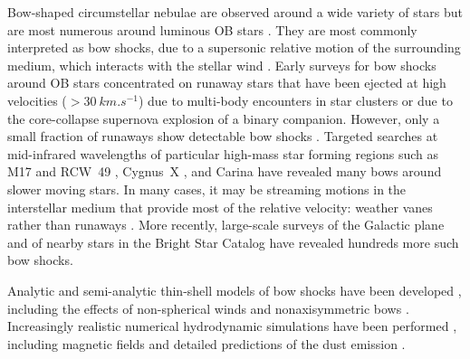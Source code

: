 \documentclass[useAMS, usenatbib, a4paper]{mnras}
\begin{document}
Bow-shaped circumstellar nebulae are observed around a wide variety of
stars \citep{Gull:1979a, Cox:2012a, Cordes:1993a} but are most
numerous around luminous OB stars \citep{Kobulnicky:2016a}.  They are
most commonly interpreted as bow shocks, due to a supersonic relative
motion of the surrounding medium, which interacts with the stellar
wind \citep{Wilkin:1996a}.  Early surveys for bow shocks around OB
stars \citep{van-Buren:1995a} concentrated on runaway stars
\citep{Blaauw:1961a, Hoogerwerf:2001a} that have been ejected at high
velocities (\(> \SI{30}{km.s^{-1}}\)) due to multi-body encounters in
star clusters or due to the core-collapse supernova explosion of a
binary companion.  However, only a small fraction of runaways show
detectable bow shocks \citep{Huthoff:2002a, Peri:2012a, Peri:2015a,
  Prisegen:2019a}. Targeted searches at mid-infrared wavelengths of
particular high-mass star forming regions such as M17 and RCW~49
\citep{Povich:2008a}, Cygnus~X \citep{Kobulnicky:2010a}, and Carina
\citep{Sexton:2015b} have revealed many bows around slower moving
stars.  In many cases, it may be streaming motions in the interstellar
medium that provide most of the relative velocity: weather vanes
rather than runaways \citep{Povich:2008a}.  More recently, large-scale
surveys of the Galactic plane \citep{Kobulnicky:2016a,
  Kobulnicky:2017a} and of nearby stars in the Bright Star Catalog
\citep{Bodensteiner:2018a} have revealed hundreds more such bow shocks.

Analytic and semi-analytic thin-shell models of bow shocks have been
developed \citep{van-Buren:1992a, Wilkin:1996a, Canto:1996},
including the effects of non-spherical winds and nonaxisymmetric bows
\citep{Wilkin:2000a, Henney:2002a, Canto:2005a, Tarango-Yong:2018a}.
Increasingly realistic numerical hydrodynamic simulations have been
performed \citep{Matsuda:1989a, Raga:1997a, Comeron:1998a, Arthur:2006a,
  Meyer:2014b, Mackey:2015a}, including magnetic fields
\citep{Meyer:2017a, Katushkina:2017a, Katushkina:2018a} and detailed
predictions of the dust emission \citep{Meyer:2016a, Acreman:2016a,
  Mackey:2016a}.

\end{document}
